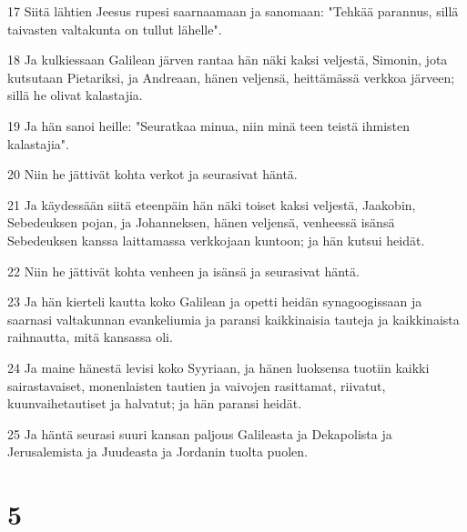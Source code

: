 \par 17 Siitä lähtien Jeesus rupesi saarnaamaan ja sanomaan: "Tehkää parannus, sillä taivasten valtakunta on tullut lähelle".
\par 18 Ja kulkiessaan Galilean järven rantaa hän näki kaksi veljestä, Simonin, jota kutsutaan Pietariksi, ja Andreaan, hänen veljensä, heittämässä verkkoa järveen; sillä he olivat kalastajia.
\par 19 Ja hän sanoi heille: "Seuratkaa minua, niin minä teen teistä ihmisten kalastajia".
\par 20 Niin he jättivät kohta verkot ja seurasivat häntä.
\par 21 Ja käydessään siitä eteenpäin hän näki toiset kaksi veljestä, Jaakobin, Sebedeuksen pojan, ja Johanneksen, hänen veljensä, venheessä isänsä Sebedeuksen kanssa laittamassa verkkojaan kuntoon; ja hän kutsui heidät.
\par 22 Niin he jättivät kohta venheen ja isänsä ja seurasivat häntä.
\par 23 Ja hän kierteli kautta koko Galilean ja opetti heidän synagoogissaan ja saarnasi valtakunnan evankeliumia ja paransi kaikkinaisia tauteja ja kaikkinaista raihnautta, mitä kansassa oli.
\par 24 Ja maine hänestä levisi koko Syyriaan, ja hänen luoksensa tuotiin kaikki sairastavaiset, monenlaisten tautien ja vaivojen rasittamat, riivatut, kuunvaihetautiset ja halvatut; ja hän paransi heidät.
\par 25 Ja häntä seurasi suuri kansan paljous Galileasta ja Dekapolista ja Jerusalemista ja Juudeasta ja Jordanin tuolta puolen.

\chapter{5}

